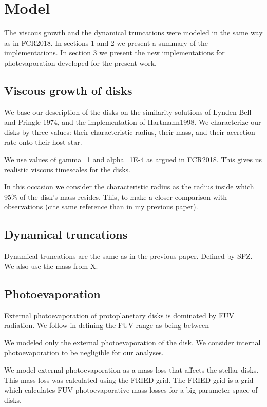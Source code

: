 \documentclass[fleqn,usenatbib]{mnras}
\begin{document}
\section{Model}
\label{sec:model}

The viscous growth and the dynamical truncations were modeled in the same way as in FCR2018. In sections 1 and 2 we present a summary of the implementations. In section 3 we present the new implementations for photevaporation developed for the present work.

\subsection{Viscous growth of disks}

We base our description of the disks on the similarity solutions of Lynden-Bell and Pringle 1974, and the implementation of Hartmann1998. We characterize our disks by three values: their characteristic radius, their mass, and their accretion rate onto their host star.

We use values of gamma=1 and alpha=1E-4 as argued in FCR2018. This gives us realistic viscous timescales for the disks.

In this occasion we consider the characteristic radius as the radius inside which 95\% of the disk's mass resides. This, to make a closer comparison with observations (cite same reference than in my previous paper).

\subsection{Dynamical truncations}
Dynamical truncations are the same as in the previous paper. Defined by SPZ. We also use the mass from X.

\subsection{Photoevaporation}
External photoevaporation of protoplanetary disks is dominated by FUV radiation. We follow \citet{adams2004} in defining the FUV range as being between 


We modeled only the external photoevaporation of the disk. We consider internal photoevaporation to be negligible for our analyses.

We model external photoevaporation as a mass loss that affects the stellar disks. This mass loss was calculated using the FRIED grid. The FRIED grid is a grid which calculates FUV photoevaporative mass losses for a big parameter space of disks. 
\end{document}

